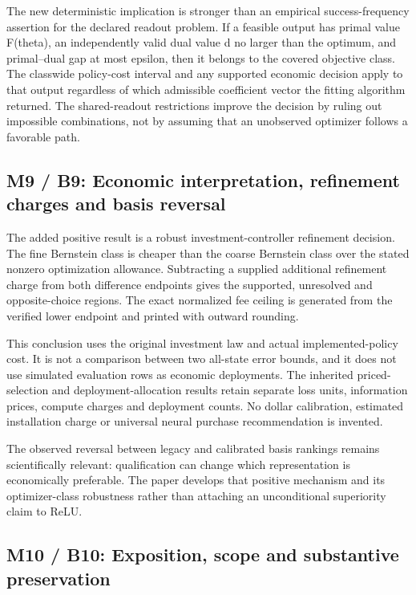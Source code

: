 \documentclass[ecta,nameyear,draft]{econsocart}
\begin{document}
The new deterministic implication is stronger than an empirical
success-frequency assertion for the declared readout problem. If a
feasible output has primal value F(theta), an independently valid dual
value d no larger than the optimum, and primal--dual gap at most
epsilon, then it belongs to the covered objective class. The classwide
policy-cost interval and any supported economic decision apply to that
output regardless of which admissible coefficient vector the fitting
algorithm returned. The shared-readout restrictions improve the decision
by ruling out impossible combinations, not by assuming that an
unobserved optimizer follows a favorable path.

\hypertarget{m9-b9-economic-interpretation-refinement-charges-and-basis-reversal}{%
\subsection{M9 / B9: Economic interpretation, refinement charges and
basis
reversal}\label{m9-b9-economic-interpretation-refinement-charges-and-basis-reversal}}

The added positive result is a robust investment-controller refinement
decision. The fine Bernstein class is cheaper than the coarse Bernstein
class over the stated nonzero optimization allowance. Subtracting a
supplied additional refinement charge from both difference endpoints
gives the supported, unresolved and opposite-choice regions. The exact
normalized fee ceiling is generated from the verified lower endpoint and
printed with outward rounding.

This conclusion uses the original investment law and actual
implemented-policy cost. It is not a comparison between two all-state
error bounds, and it does not use simulated evaluation rows as economic
deployments. The inherited priced-selection and deployment-allocation
results retain separate loss units, information prices, compute charges
and deployment counts. No dollar calibration, estimated installation
charge or universal neural purchase recommendation is invented.

The observed reversal between legacy and calibrated basis rankings
remains scientifically relevant: qualification can change which
representation is economically preferable. The paper develops that
positive mechanism and its optimizer-class robustness rather than
attaching an unconditional superiority claim to ReLU.

\hypertarget{m10-b10-exposition-scope-and-substantive-preservation}{%
\subsection{M10 / B10: Exposition, scope and substantive
preservation}\label{m10-b10-exposition-scope-and-substantive-preservation}}
\end{document}
